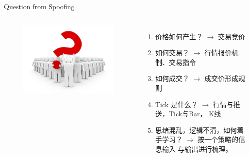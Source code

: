 \begin{frame}{Question from Spoofing}
  \begin{columns}
    \column{3cm}
    \begin{figure}
      \centering
      \includegraphics[width=1\textwidth]{figures/question.jpg}
    \end{figure}
    \column{6cm}
    \begin{enumerate}[<+-|alert@+>]
    \item 价格如何产生？ $\rightarrow$ 交易竞价
    \item 如何交易？ $\rightarrow$ 行情报价机制、交易指令
    \item 如何成交？ $\rightarrow$ 成交价形成规则
    \item Tick 是什么？ $\rightarrow$ 行情与推送，Tick与Bar， K线
    \item 思绪混乱，逻辑不清，如何着手学习？ $\rightarrow$ 按一个策略的信息输入
      与输出进行梳理。
    \end{enumerate}
    \end{columns}
\end{frame}

